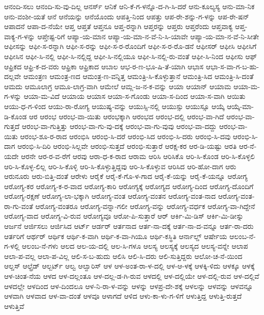{ಆನಂದಿ-ಸಲು
ಆನಂದಿ-ಸು-ವು-ದಿಲ್ಲ
ಆನರ್ಸ್
ಆನಿಕೆ
ಆನಿ-ಕೆ-ಗ-ಳನ್ನೊ-ದ-ಗಿ-ಸಿ-ದರೆ
ಆನು-ಕೂಲ್ಯಸ್ಯ
ಆನು-ಮಾ-ನಿಕ
ಆನು-ವಂಶೀ-ಯತೆ
ಆನೆ
ಆನೆಯನ್ನು
ಆನೆಯೊಂದು
ಆಪತ್ತಿ-ನಿಂದ
ಆಪತ್ತು
ಆಪ-ರೇ-ಶನ್ನು-ಗ-ಳನ್ನು
ಆಪ-ರೇ-ಷನ್
ಆಪಾದನೆ
ಆಪಾ-ದ-ನೆಯೇ
ಆಪ್ತ
ಆಪ್ತತೆ
ಆಪ್ತನೂ
ಆಪ್ತ-ರನ್ನಾಗಿ
ಆಪ್ತರನ್ನು
ಆಪ್ತರು
ಆಪ್ತರೆಂದು
ಆಪ್ತವಾಕ್ಯ
ಆಪ್ತ-ವಾಕ್ಯ-ಗ-ಳನ್ನು
ಆಪ್ತೇಷ್ಟ-ರಿಗೆ
ಆಪ್ಯಾ-ಯ-ಮಾನ
ಆಪ್ಯಾ-ಯ-ಮಾ-ನ-ವೆ-ನಿ-ಸಿ-ಯಾವೇ
ಆಪ್ಯಾ-ಯ-ಮಾ-ನ-ವೆ-ನಿ-ಸೀತೇ
ಆಫೀಸನ್ನು
ಆಫೀ-ಸ-ರನ್ನಾಗಿ
ಆಫೀ-ಸ-ರನ್ನು
ಆಫೀ-ಸ-ರ-ರೊಂದಿಗೆ
ಆಫೀ-ಸ-ರ-ರೊ-ಡನೆ
ಆಫೀಸರ್
ಆಫೀಸಿ
ಆಫೀಸಿಗೆ
ಆಫೀಸಿನ
ಆಫೀ-ಸಿ-ನಲ್ಲಿ
ಆಫೀ-ಸಿ-ನಲ್ಲಿದ್ದ
ಆಫೀ-ಸಿ-ನಲ್ಲಿಯೂ
ಆಫೀ-ಸಿ-ನಲ್ಲಿ-ರು-ವಂತೆ
ಆಫೀ-ಸಿ-ನಿಂದ
ಆಫೀಸು
ಆಫ್
ಆಫ್ರಿಕದ
ಆಫ್ರಿ-ಕ-ದ-ವರು
ಆಫ್ರಿಕಾ
ಆಫ್ರಿಕಾದ
ಆಬಾಲ
ಆಭ-ರ-ಣ-ಭೂ-ಷಿ-ತೆ-ಯಾಗಿ
ಆಭಾಸ
ಆಭಾ-ಸ-ವಾ-ಗ-ಬ-ಹು-ದಲ್ಲವೇ
ಆಮಂತ್ರಣ
ಆಮಂತ್ರ-ಣದ
ಆಮಂತ್ರ-ಣ-ವನ್ನಿತ್ತ
ಆಮಂತ್ರಿ-ಸಿ-ಕೊಳ್ಳುತ್ತಾನೆ
ಆಮಂತ್ರಿ-ಸಿದ
ಆಮಂತ್ರಿ-ಸಿ-ದಂತೆ
ಆಮದು
ಆಮೂಲಾಗ್ರ
ಆಮೂ-ಲಾಗ್ರ-ವಾಗಿ
ಆಮೇಲೆ
ಆಮ್ಲ-ಜ-ನ-ಕ-ವನ್ನು
ಆಯಾ
ಆಯಾನ್
ಆಯಾಮ
ಆಯಾ-ಮ-ಗ-ಳನ್ನು
ಆಯಾ-ಮ-ವಿದೆ
ಆಯಾಯ
ಆಯಾಸ
ಆಯಾ-ಸ-ಗೊಂಡು
ಆಯಾ-ಸ-ದಿಂದ
ಆಯಾ-ಸ-ವಾಗಿ
ಆಯಿತು
ಆಯು-ಧ-ಗ-ಳಿಂದ
ಆಯು-ರಾ-ರೋಗ್ಯ
ಆಯುಷ್ಯ-ವನ್ನು
ಆಯುಸ್ಸಿ-ನಲ್ಲಿ
ಆಯುಸ್ಸು
ಆಯುಸ್ಸೂ
ಆಯ್ಕೆ
ಆಯ್ಕೆ-ಮಾ-ಡಿ-ಕೊಂಡ
ಆರ
ಆರಂಭ
ಆರಂಭ-ವಾ-ಯಿತು
ಆರಂಭಕ್ಕಾಗಿ
ಆರಂಭದ
ಆರಂಭ-ದಲ್ಲಿ
ಆರಂಭ-ವಾ-ಗಿದೆ
ಆರಂಭ-ವಾ-ಗುತ್ತದೆ
ಆರಂಭ-ವಾ-ಗುತ್ತಿತ್ತು
ಆರಂಭ-ವಾ-ಗು-ವು-ದಕ್ಕೆ
ಆರಂಭ-ವಾ-ಗು-ವುವು
ಆರಂಭ-ವಾ-ದದ್ದು
ಆರಂಭ-ವಾ-ಯಿತು
ಆರಂಭ-ಶೂ-ರ-ರಾದ
ಆರಂಭಿಸಿ
ಆರಂಭಿ-ಸಿ-ದರೆ
ಆರಂಭಿ-ಸಿದ
ಆರಂಭಿ-ಸಿ-ದರು
ಆರಂಭಿ-ಸಿ-ದವು
ಆರಂಭಿ-ಸಿ-ದಾಗ
ಆರಂಭಿ-ಸಿ-ದಿರಿ
ಆರಂಭಿ-ಸಿಲ್ಲವೇ
ಆರಂಭಿ-ಸುತ್ತದೆ
ಆರಂಭಿ-ಸುತ್ತಾರೆ
ಆರಕ್ಷ-ಕರ
ಆರ-ಡಿ-ಯಷ್ಟು
ಆರತಿ
ಆರ-ನೆ-ಯದೇ
ಆರನೇ
ಆರ-ರ-ವ-ರೆಗೆ
ಆರವು
ಆರಾ-ಧ-ಕ-ರಾದ
ಆರಾಮ
ಆರಿಸಿ
ಆರಿಸಿಕೊ
ಆರಿ-ಸಿ-ಕೊಂಡ
ಆರಿ-ಸಿ-ಕೊಳ್ಳಲಿ
ಆರಿ-ಸಿ-ಕೊಳ್ಳ-ಲಿಲ್ಲ
ಆರಿ-ಸಿ-ಕೊಳ್ಳಿ
ಆರಿ-ಸಿ-ಕೊಳ್ಳುತ್ತಿದ್ದವು
ಆರಿ-ಸಿ-ಕೊಳ್ಳುವ
ಆರಿಸಿದ
ಆರಿ-ಹೋ-ದಾಗ
ಆರು
ಆರುನೂರು
ಆರು-ಬಿತ್ತಿ-ದಂತೆ
ಆರೇಳು
ಆರೈಕೆ
ಆರೈ-ಕೆ-ಗೊ-ಳ-ಗಾದ
ಆರೈ-ಕೆ-ಯನ್ನು
ಆರೈ-ಕೆ-ಯನ್ನೂ
ಆರೋಗ್ಯ
ಆರೋಗ್ಯ-ಕರ
ಆರೋಗ್ಯ-ಕ-ರ-ವಾದ
ಆರೋಗ್ಯ-ಕಾರಿ
ಆರೋಗ್ಯಕ್ಕೆ
ಆರೋಗ್ಯದ
ಆರೋಗ್ಯ-ದಿಂದ
ಆರೋಗ್ಯ-ದೊಂದಿಗೆ
ಆರೋಗ್ಯ-ರಕ್ಷಣೆ
ಆರೋಗ್ಯ-ಲಾ-ಭಕ್ಕಾಗಿ
ಆರೋಗ್ಯ-ವಂತ
ಆರೋಗ್ಯ-ವಂತನ
ಆರೋಗ್ಯ-ವಂತ-ನಾದ
ಆರೋಗ್ಯ-ವಂತ-ರಾ-ಗು-ವಂತೆ
ಆರೋಗ್ಯ-ವಂತರೂ
ಆರೋಗ್ಯ-ವನ್ನಾ-ಗಲೀ
ಆರೋಗ್ಯ-ವನ್ನು
ಆರೋಗ್ಯ-ವರ್ಧಕ
ಆರೋಗ್ಯ-ವಾ-ಗಿದ್ದೇನೆ
ಆರೋಗ್ಯ-ವಾದ
ಆರೋಗ್ಯ-ವಿ-ರುವ
ಆರೋಗ್ಯವೂ
ಆರೋ-ಪಿ-ಸುತ್ತಾರೆ
ಆರ್
ಆರ್ಕಿ-ಮಿ-ಡಿಸ್
ಆರ್ಕಿ-ಮಿ-ಡೀಸ್ನು
ಆರ್ಜನೆ
ಆರ್ಜಿಸಲು
ಆರ್ಜಿಸಿದ
ಆರ್ಟ್
ಆರ್ಡರ್
ಆರ್ತನಾದ
ಆರ್ತ-ನಾ-ದಕ್ಕೆ
ಆರ್ತ-ನಾ-ದ-ವನ್ನೂ
ಆರ್ತ-ರಾ-ದರು
ಆರ್ತರಿಗೆ
ಆರ್ಥರ್
ಆರ್ಥಿಕ
ಆರ್ಥಿ-ಕ-ವಾಗಿ
ಆರ್ಥಿ-ಕ-ವಾ-ಗಿಯೂ
ಆರ್ಥಿ-ಕಸ್ಥಿತಿ
ಆರ್ನಾಲ್ಡ್
ಆರ್ಷೇಯ
ಆಲಂಬ-ನೆ-ಗ-ಳಲ್ಲಿ
ಆಲಂಬ-ನೆ-ಗಳು
ಆಲದ
ಆಲ-ಯ-ದಲ್ಲಿ
ಆಲ-ಸಿ-ಗಳೂ
ಆಲಸ್ಯ
ಆಲಸ್ಯಕ್ಕೆ
ಆಲಸ್ಯದ
ಆಲಸ್ಯ-ವನ್ನೇ
ಆಲಾಪ
ಆಲಾ-ಪ-ವಲ್ಲ
ಆಲಾ-ಪ-ವಿಲ್ಲ
ಆಲಿ-ಸ-ಬ-ಹುದು
ಆಲಿಸಿ
ಆಲಿ-ಸಿ-ದರು
ಆಲಿ-ಸುತ್ತಿದ್ದರು
ಆಲೋ-ಚ-ನೆ-ಯಿಂದ
ಆಲ್ಡಸ್
ಆಲ್ಫ್ರೆಡ್
ಆಲ್ಬರ್ಟ್
ಆಲ್ವ
ಆಲ್ವಾರಿಸ್
ಆಳ
ಆಳ-ಅಂತ-ರಾ-ಳ-ದಲ್ಲಿ
ಆಳ-ಆ-ಳಕ್ಕೆ
ಆಳಕ್ಕಿ-ಳಿದು
ಆಳಕ್ಕೂ
ಆಳಕ್ಕೆ
ಆಳ-ಚಿಂತ-ನೆಯ
ಆಳದ
ಆಳ-ದಲ್ಲಂತೂ
ಆಳ-ದಲ್ಲ-ಡ-ಗಿ-ರುವ
ಆಳದಲ್ಲಿ
ಆಳ-ದಲ್ಲಿಯೇ
ಆಳ-ದಲ್ಲಿ-ರುವ
ಆಳ-ದಲ್ಲಿವೆ
ಆಳದಲ್ಲೇ
ಆಳದಿಂದ
ಆಳ-ದಿಂದಲೂ
ಆಳ-ನಿ-ರಾ-ಳ-ವನ್ನು
ಆಳನ್ನು
ಆಳಪ್ರ-ದೇ-ಶಕ್ಕೆ
ಆಳಲನ್ನು
ಆಳವನ್ನು
ಆಳವನ್ನೂ
ಆಳವಾಗಿ
ಆಳವಾದ
ಆಳ-ವಾ-ದಂತೆ
ಆಳವೂ
ಆಳಾಗದೆ
ಆಳಿದ
ಆಳು-ಕಾ-ಳು-ಗ-ಳಿಗೆ
ಆಳುತ್ತಿದ್ದ
ಆಳುತ್ತಿ-ರುತ್ತದೆ
ಆಳುತ್ತಿವೆ
}
